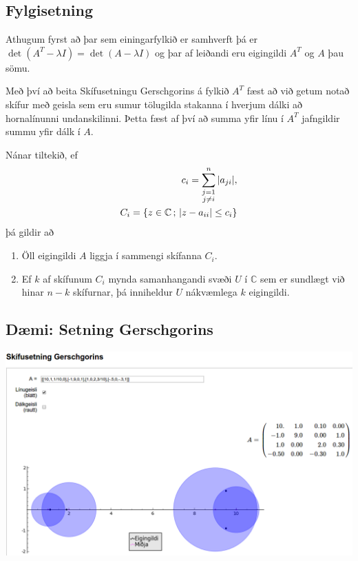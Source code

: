 \documentclass[letterpaper,10pt,icelandic]{sphinxmanual}
\begin{document}
\subsection{Fylgisetning}
\label{kafli09:fylgisetning}
Athugum fyrst að þar sem einingarfylkið er samhverft þá er
\(\det(A^T-\lambda I) = \det(A-\lambda I)\) og þar af leiðandi
eru eigingildi \(A^T\) og \(A\) þau sömu.

Með því að beita Skífusetningu Gerschgorins á fylkið \(A^T\)
fæst að við getum notað skífur með geisla sem eru
sumur tölugilda stakanna í hverjum dálki að hornalínunni
undanskilinni. Þetta fæst af því að
summa yfir línu í \(A^T\) jafngildir summu yfir dálk
í \(A\).

Nánar tiltekið, ef
\begin{gather}
\begin{split}c_i=\sum\limits_{{\substack{j=1 \\ j\neq i}}}^n|a_{ji}|,\\
C_i=\{z\in {{\mathbb  C}}\,;\, |z-a_{ii}|\leq c_i\}\end{split}\notag
\end{gather}
þá gildir að
\begin{enumerate}
\item {} 
Öll eigingildi \(A\) liggja í sammengi skífanna \(C_i\).

\item {} 
Ef \(k\) af skífunum \(C_i\) mynda samanhangandi svæði
\(U\) í \({{\mathbb  C}}\) sem er sundlægt við hinar
\(n-k\) skífurnar, þá inniheldur \(U\) nákvæmlega \(k\)
eigingildi.

\end{enumerate}


\subsection{Dæmi: Setning Gerschgorins}
\label{kafli09:daemi-setning-gerschgorins}

\begin{center}
\includegraphics[width=13 cm,keepaspectratio=true]{gerschgorin.png}

\end{center}
\end{document}
